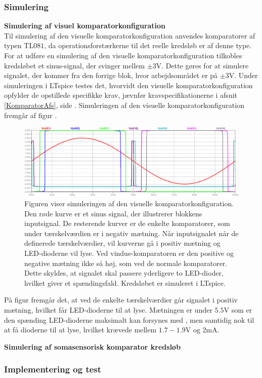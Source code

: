 \subsubsection{Simulering}
\noindent\textbf{Simulering af visuel komparatorkonfiguration} \\
Til simulering af den visuelle komparatorkonfiguration anvendes komparatorer af typen TL$081$, da operationsforstærkerne til det reelle kredsløb er af denne type. For at udføre en simulering af den visuelle komparatorkonfiguration tilkobles kredsløbet et sinus-signal, der svinger mellem $\pm3$V. Dette gøres for at simulere signalet, der kommer fra den forrige blok, hvor arbejdsområdet er på $\pm3$V. Under simuleringen i LTspice testes det, hvorvidt den visuelle komparatorkonfiguration opfylder de opstillede specifikke krav, jævnfør kravspecifikationerne i afsnit \ref{KomparatorAfs}, side \pageref{KomparatorAfs}. Simuleringen af den visuelle komparatorkonfiguration fremgår af figur . 
\begin{figure}[H]
	\centering
	\includegraphics[scale=1.0]{figures/cProblemloesning/komparator_visuel_simulering_samlet.PNG}
	\caption{Figuren viser simuleringen af den visuelle komparatorkonfiguration. Den røde kurve er et sinus signal, der illustrerer blokkens inputsignal. De resterende kurver er de enkelte komparatorer, som under tærskelværdien er i negativ mætning. Når inputsignalet når de definerede tærskelværdier, vil kurverne gå i positiv mætning og LED-dioderne vil lyse. Ved vindue-komparatoren er den positive og negative mætning ikke så høj, som ved de normale komparatorer. Dette skyldes, at signalet skal passere yderligere to LED-dioder, hvilket giver et spændingsfald. Kredsløbet er simuleret i LTspice.}
	\label{fig:komparator_visuel_simulering_samlet}
\end{figure}
På figur  fremgår det, at ved de enkelte tærskelværdier går signalet i positiv mætning, hvilket får LED-dioderne til at lyse. Mætningen er under $5.5$V som er den spænding LED-dioderne maksimalt kan forsynes med  , men samtidig nok til at få dioderne til at lyse, hvilket krævede mellem $1.7-1.9$V og $2$mA. 

\noindent\textbf{Simulering af somasensorisk komparator kredsløb} \\

\subsubsection{Implementering og test}

